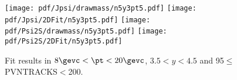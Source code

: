 \begin{figure}[H]
\begin{center}
\texttt{[image: pdf/Jpsi/drawmass/n5y3pt5.pdf]}
\texttt{[image: pdf/Jpsi/2DFit/n5y3pt5.pdf]}
\vspace*{-0.5cm}
\texttt{[image: pdf/Psi2S/drawmass/n5y3pt5.pdf]}
\texttt{[image: pdf/Psi2S/2DFit/n5y3pt5.pdf]}
\vspace*{-0.5cm}
\end{center}
\caption{Fit results in $8\gevc<\pt<20\gevc$, $3.5<y<4.5$ and 95$\leq$PVNTRACKS$<$200.}
\label{Fitn5y3pt5}
\end{figure}
